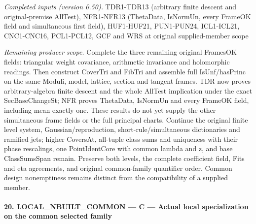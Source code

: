 \documentclass[11pt,a4paper]{article}
\numberwithin{equation}{section}
\theoremstyle{remark}\newtheorem{remark}[theorem]{Remark}
\begin{document}
\emph{Completed inputs (version 0.50).} TDR1-TDR13 (arbitrary finite descent and original-premise AllTest), NFR1-NFR13 (ThetaData, IsNormUn, every FrameOK field and simultaneous first field), HUF1-HUF21, PUN1-PUN24, ICL1-ICL21, CNC1-CNC16, PCL1-PCL12, GCF and WRS at original supplied-member scope

\emph{Remaining producer scope.} Complete the three remaining original FramesOK fields: triangular weight covariance, arithmetic invariance and holomorphic readings. Then construct CoverTri and FibTri and assemble full IsUnf/hasPrinc on the same Moduli, model, lattice, section and tangent frames. TDR now proves arbitrary-algebra finite descent and the whole AllTest implication under the exact SecBaseChangeSt; NFR proves ThetaData, IsNormUn and every FrameOK field, including mean exactly one. These results do not yet supply the other simultaneous frame fields or the full principal charts. Continue the original finite level system, Gaussian/reproduction, short-rule/simultaneous dictionaries and ramified jets; higher CoversAt, all-tuple class sums and uniqueness with their phase rescalings, one PointIdentCore with common lambda and z, and base ClassSumsSpan remain. Preserve both levels, the complete coefficient field, Fits and eta agreements, and original common-family quantifier order. Common design nonemptiness remains distinct from the compatibility of a supplied member.



\paragraph{20. LOCAL\_\allowbreak NBUILT\_\allowbreak COMMON — C — Actual local specialization on the common selected family}
\end{document}
